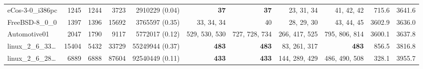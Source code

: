 \begin{table*}
\begin{tiny}
{{\begin{tabular}{lrrrrrrrrrr}
eCos-3-0\_i386pc & \num[text-series-to-math=true]{1245} & \num[text-series-to-math=true]{1244} & \num[text-series-to-math=true]{3723} & \num[text-series-to-math=true]{2910229} (\num[text-series-to-math=true]{0.04}) & \textbf{\num[text-series-to-math=true]{37}} & \textbf{\num[text-series-to-math=true]{37}} & \num[text-series-to-math=true]{23}, \num[text-series-to-math=true]{31}, \num[text-series-to-math=true]{34} & \num[text-series-to-math=true]{41}, \num[text-series-to-math=true]{42}, \num[text-series-to-math=true]{42} & 715.6 & 3641.6\\
FreeBSD-8\_0\_0 & \num[text-series-to-math=true]{1397} & \num[text-series-to-math=true]{1396} & \num[text-series-to-math=true]{15692} & \num[text-series-to-math=true]{3765597} (\num[text-series-to-math=true]{0.35}) & \num[text-series-to-math=true]{33}, \num[text-series-to-math=true]{34}, \num[text-series-to-math=true]{34} & \num[text-series-to-math=true]{40} & \num[text-series-to-math=true]{28}, \num[text-series-to-math=true]{29}, \num[text-series-to-math=true]{30} & \num[text-series-to-math=true]{43}, \num[text-series-to-math=true]{44}, \num[text-series-to-math=true]{45} & 3602.9 & 3636.0\\
Automotive01 & \num[text-series-to-math=true]{2047} & \num[text-series-to-math=true]{1790} & \num[text-series-to-math=true]{9117} & \num[text-series-to-math=true]{5772017} (\num[text-series-to-math=true]{0.12}) & \num[text-series-to-math=true]{529}, \num[text-series-to-math=true]{530}, \num[text-series-to-math=true]{530} & \num[text-series-to-math=true]{727}, \num[text-series-to-math=true]{728}, \num[text-series-to-math=true]{734} & \num[text-series-to-math=true]{266}, \num[text-series-to-math=true]{417}, \num[text-series-to-math=true]{525} & \num[text-series-to-math=true]{795}, \num[text-series-to-math=true]{806}, \num[text-series-to-math=true]{814} & 3600.1 & 3637.8\\
linux\_2\_6\_33\ldots & \num[text-series-to-math=true]{15404} & \num[text-series-to-math=true]{5432} & \num[text-series-to-math=true]{33729} & \num[text-series-to-math=true]{55249944} (\num[text-series-to-math=true]{0.37}) & \textbf{\num[text-series-to-math=true]{483}} & \textbf{\num[text-series-to-math=true]{483}} & \num[text-series-to-math=true]{83}, \num[text-series-to-math=true]{261}, \num[text-series-to-math=true]{317} & \textbf{\num[text-series-to-math=true]{483}} & 856.5 & 3816.8\\
linux\_2\_6\_28\ldots & \num[text-series-to-math=true]{6889} & \num[text-series-to-math=true]{6888} & \num[text-series-to-math=true]{87604} & \num[text-series-to-math=true]{92540449} (\num[text-series-to-math=true]{0.11}) & \textbf{\num[text-series-to-math=true]{433}} & \textbf{\num[text-series-to-math=true]{433}} & \num[text-series-to-math=true]{144}, \num[text-series-to-math=true]{289}, \num[text-series-to-math=true]{429} & \num[text-series-to-math=true]{486}, \num[text-series-to-math=true]{490}, \num[text-series-to-math=true]{508} & 328.1 & 3955.7\\

\end{tabular}}}
\end{tiny}
\end{table*}
